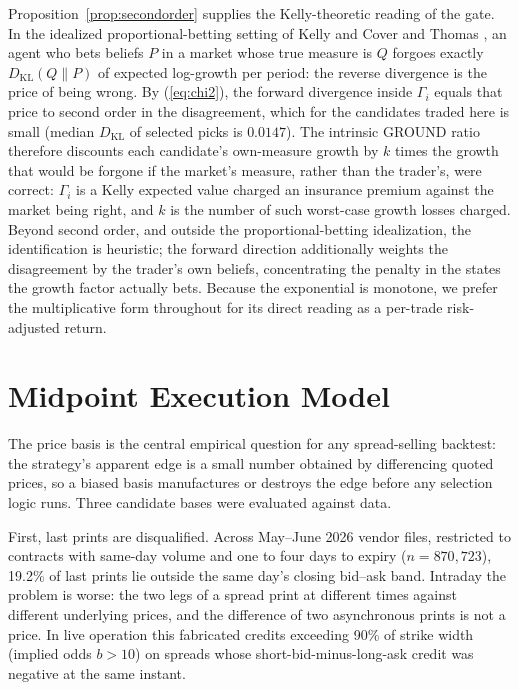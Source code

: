 \documentclass[11pt]{article}
\newcommand{\dkl}{D_{\mathrm{KL}}}
\begin{document}
Proposition~\ref{prop:secondorder} supplies the Kelly-theoretic reading of
the gate. In the idealized proportional-betting setting of Kelly
\cite{kelly1956} and Cover and Thomas \cite{coverthomas2006}, an agent who
bets beliefs $P$ in a market whose true measure is $Q$ forgoes exactly
$\dkl(Q \| P)$ of expected log-growth per period: the reverse divergence is
the price of being wrong. By (\ref{eq:chi2}), the forward divergence inside
$\Gamma_i$ equals that price to second order in the disagreement, which for
the candidates traded here is small (median $\dkl$ of selected picks is
$0.0147$). The intrinsic GROUND ratio therefore discounts each candidate's
own-measure growth by $k$ times the growth that would be forgone if the
market's measure, rather than the trader's, were correct: $\Gamma_i$ is a
Kelly expected value charged an insurance premium against the market being
right, and $k$ is the number of such worst-case growth losses charged.
Beyond second order, and outside the proportional-betting idealization, the
identification is heuristic; the forward direction additionally weights the
disagreement by the trader's own beliefs, concentrating the penalty in the
states the growth factor actually bets. Because the exponential is monotone,
we prefer the multiplicative form throughout for its direct reading as a
per-trade risk-adjusted return.

\section{Midpoint Execution Model}
\label{sec:execution}

The price basis is the central empirical question for any spread-selling
backtest: the strategy's apparent edge is a small number obtained by
differencing quoted prices, so a biased basis manufactures or destroys the
edge before any selection logic runs. Three candidate bases were evaluated
against data.

First, last prints are disqualified. Across May--June 2026 vendor files,
restricted to contracts with same-day volume and one to four days to expiry
($n = 870{,}723$), 19.2\% of last prints lie outside the same day's closing
bid--ask band. Intraday the problem is worse: the two legs of a spread print
at different times against different underlying prices, and the difference of
two asynchronous prints is not a price. In live operation this fabricated
credits exceeding 90\% of strike width (implied odds $b > 10$) on spreads
whose short-bid-minus-long-ask credit was negative at the same instant.
\end{document}
